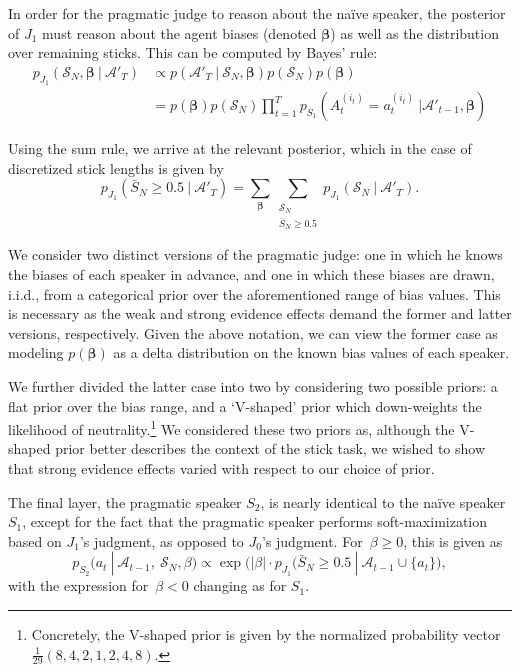 \documentclass[10pt,letterpaper]{article}
\begin{document}
In order for the pragmatic judge to reason about the na\"ive speaker, the posterior of $J_1$ must reason about the agent
biases (denoted $\bm{\beta}$) as well as the distribution over remaining sticks. This can be computed by Bayes' rule:
\begin{align*}
	p_{J_1} (\mathcal{S}_N, \bm{\beta} \ | \ \mathcal{A}'_T) &\propto p(\mathcal{A}'_T \ | \ \mathcal{S}_N, \bm{\beta}) p(\mathcal{S}_N) p(\bm{\beta}) \\
	&= p(\bm{\beta}) p(\mathcal{S}_N) \prod_{t=1}^T p_{S_1}(A_t^{(i_t)}=a_t^{(i_t)} \ |  \mathcal{A}'_{t-1}, \bm{\beta})
\end{align*}

Using the sum rule, we arrive at the relevant posterior, which in the case of discretized stick lengths is given by
\begin{equation}
	p_{J_1} ( \bar{S}_N \ge 0.5 \ | \ \mathcal{A}'_T ) = \sum_{\bm{\beta}} \sum_{\substack{\mathcal{S}_N \\ \bar{S}_N \ge 0.5}} p_{J_1} (\mathcal{S}_N \ | \ \mathcal{A}'_T).
\end{equation}

We consider two distinct versions of the pragmatic judge: one in which he knows the biases of each speaker in advance, and
one in which these biases are drawn, i.i.d., from a categorical prior over the aforementioned range of bias values. This is 
necessary as the weak and strong evidence effects demand the former and latter versions, respectively. Given the above notation,
we can view the former case as modeling $p(\bm{\beta})$ as a delta distribution on the known bias values of each speaker.

We further divided the latter case into two by considering two possible priors: a flat prior over the bias range, and a `V-shaped' prior which down-weights 
the likelihood of neutrality.\footnote{Concretely, the V-shaped prior is given by the normalized probability vector $\frac{1}{29} (8, 4, 2, 1, 2, 4, 8)$.} 
We considered these two priors as, although the V-shaped prior better describes the context of the stick task, we wished to show 
that strong evidence effects varied with respect to our choice of prior.

The final layer, the pragmatic speaker $S_2$, is nearly identical to the na\"ive speaker $S_1$, except for the fact that
the pragmatic speaker performs soft-maximization based on $J_1$'s judgment, as opposed to $J_0$'s judgment. For~${\beta\ge0}$,
this is given as
\begin{equation}
	p_{S_2} (a_t \ | \ \mathcal{A}_{t-1},\ \mathcal{S}_N, \beta) \propto \exp \bigl(\lvert\beta\rvert  \cdot p_{J_1} (\bar{S}_N \ge 0.5 \ | \ \mathcal{A}_{t-1} \cup \{a_t\} \bigr),
\end{equation}
with the expression for~${\beta<0}$ changing as for $S_1$.
\end{document}

